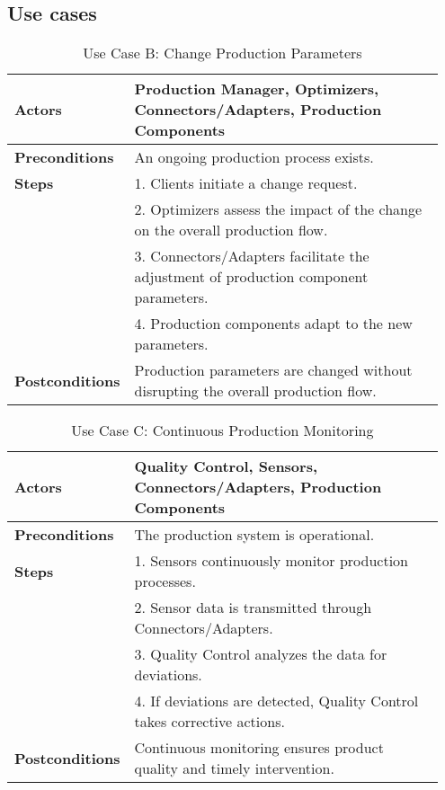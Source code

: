 \subsection{Use cases}
\label{sec:appUseCase}
\begin{table}[h]
\caption{Use Case B: Change Production Parameters}
\normalsize 
\begin{tabular}{|p{0.2\linewidth}|p{0.75\linewidth}|}
\hline
\textbf{Actors} & Production Manager, Optimizers, Connectors/Adapters, Production Components \\ \hline
\textbf{Preconditions} & An ongoing production process exists. \\ \hline
\textbf{Steps} & 
1. Clients initiate a change request. \\ &
2. Optimizers assess the impact of the change on the overall production flow. \\ &
3. Connectors/Adapters facilitate the adjustment of production component parameters. \\ &
4. Production components adapt to the new parameters. \\ \hline
\textbf{Postconditions} & Production parameters are changed without disrupting the overall production flow. \\ \hline
\end{tabular}
\end{table}

\vspace{5mm} %

\begin{table}[h]
\caption{Use Case C: Continuous Production Monitoring}
\normalsize 
\begin{tabular}{|p{0.2\linewidth}|p{0.75\linewidth}|}
\hline
\textbf{Actors} & Quality Control, Sensors, Connectors/Adapters, Production Components \\ \hline
\textbf{Preconditions} & The production system is operational. \\ \hline
\textbf{Steps} & 
1. Sensors continuously monitor production processes. \\ &
2. Sensor data is transmitted through Connectors/Adapters. \\ &
3. Quality Control analyzes the data for deviations. \\ &
4. If deviations are detected, Quality Control takes corrective actions. \\ \hline
\textbf{Postconditions} & Continuous monitoring ensures product quality and timely intervention. \\ \hline
\end{tabular}
\end{table}

